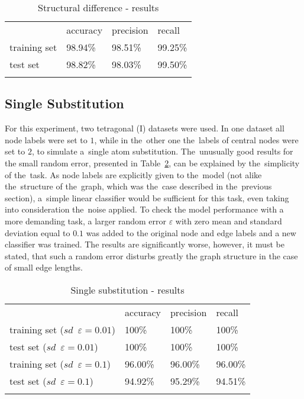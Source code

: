 \documentclass{llncs}
\begin{document}
\begin{table}[h!]
\begin{center}
\caption{Structural difference - results}
\begin{tabular}{llll}
\hline\noalign{\smallskip}
 & accuracy & precision & recall\\
\noalign{\smallskip}
\hline
\noalign{\smallskip}
training set & 98.94\% &  98.51\% & 99.25\% \\
test set & 98.82\% & 98.03\% &  99.50\% \\
\hline
\label{tab:struct}
\end{tabular}
\end{center}
\end{table}


\subsection{Single Substitution}
For this experiment, two tetragonal (I) datasets were used. In one dataset all node labels were set to $1$, while in the~other one the~labels of central nodes were set to $2$, to simulate a~single atom substitution. The~unusually good results for the small random error, presented in Table~\ref{tab:subst}, can be explained by the~simplicity of the~task. As node labels are explicitly given to the~model (not alike the~structure of the~graph, which was the~case described in the~previous section), a~simple linear classifier would be sufficient for this task, even taking into consideration the~noise applied. To check the model performance with a more demanding task, a larger random error $\varepsilon$ with zero mean and standard deviation equal to $0.1$ was added to the original node and edge labels and a new classifier was trained. The results are significantly worse, however, it must be stated, that such a random error disturbs greatly the graph structure in the case of small edge lengths.

\begin{table}[h!]
\begin{center}
\caption{Single substitution - results}
\begin{tabular}{llll}
\hline\noalign{\smallskip}
 & accuracy & precision & recall\\
\noalign{\smallskip}
\hline
\noalign{\smallskip}
training set ($sd \enspace \varepsilon = 0.01$) & 100\% &  100\% & 100\% \\
test set ($sd \enspace \varepsilon = 0.01$) & 100\% & 100\% & 100\% \\
training set ($sd \enspace \varepsilon = 0.1$) & 96.00\% &  96.00\% & 96.00\% \\
test set ($sd \enspace \varepsilon = 0.1$) & 94.92\% & 95.29\% & 94.51\% \\
\hline
\label{tab:subst}
\end{tabular}
\end{center}
\end{table}
\end{document}

